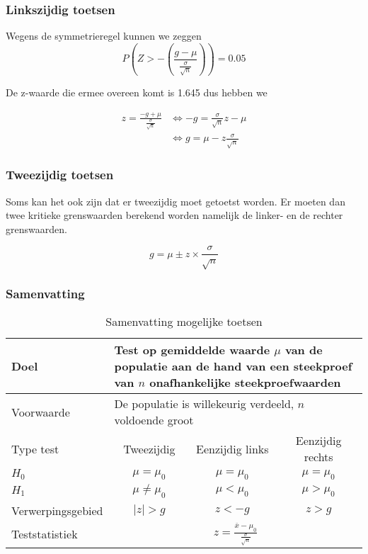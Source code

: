 \documentclass[aspectratio=169]{beamer}
\begin{document}
\begin{frame}
\frametitle{Linkszijdig toetsen}
  Wegens de symmetrieregel kunnen we zeggen
  \[ P\left(Z > - \left( \frac{g - \mu}{\frac{\sigma}{\sqrt{n}}} \right) \right) = 0.05 \]
  
  De z-waarde die ermee overeen komt is 1.645 dus hebben we
  
  \begin{align*}
    z = \frac{-g + \mu}{\frac{\sigma}{\sqrt{n}}} &\Leftrightarrow -g = \frac{\sigma}{\sqrt{n}} z - \mu \\
    & \Leftrightarrow g = \mu - z \frac{\sigma}{\sqrt{n}}
  \end{align*}
  
\end{frame}

\begin{frame}
  \frametitle{Tweezijdig toetsen}
  Soms kan het ook zijn dat er tweezijdig moet getoetst worden. Er moeten dan twee kritieke grenswaarden berekend worden namelijk de linker- en de rechter grenswaarden.

\begin{equation}
  g = \mu \pm z \times \frac{\sigma}{\sqrt{n}}
  \label{eq:kritiekeGrenswaarde}
\end{equation}
\end{frame}

\begin{frame}
  \frametitle{Samenvatting}

\begin{table}
  \centering
  \begin{tabular}{l|ccc}
    \toprule
    Doel              & \multicolumn{3}{l}{\parbox{.7\textwidth}{Test op gemiddelde waarde $\mu$ van de populatie aan de hand van een steekproef van $n$ onafhankelijke steekproefwaarden}} \\
    \midrule
    Voorwaarde        & \multicolumn{3}{l}{\parbox{.7\textwidth}{De populatie is willekeurig verdeeld, $n$ voldoende groot}} \\
    \midrule
    Type test         & Tweezijdig           & Eenzijdig links & Eenzijdig rechts \\
    \midrule
    $H_{0}$           & $\mu = \mu_{0}$      & $\mu = \mu_{0}$ & $\mu = \mu_{0}$  \\
    $H_{1}$           & $\mu \neq \mu_{0}$   & $\mu < \mu_{0}$ & $\mu > \mu_{0}$  \\
    Verwerpingsgebied & $\left|z\right| > g$ & $z< -g $        & $z>g$            \\
    Teststatistiek    & \multicolumn{3}{c}{$z = \frac{\overline{x} - \mu_{0}}{\frac{\sigma}{\sqrt{n}}}$} \\
    \bottomrule
  \end{tabular}
  \caption{Samenvatting mogelijke toetsen}
  \label{tab:toetsingsprocedures}
\end{table}
\end{frame}
\end{document}
